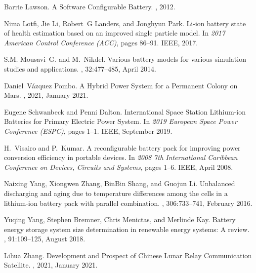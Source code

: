 \documentclass{article}
\begin{document}
\begin{thebibliography}{10}
Barrie Lawson.
\newblock A {{Software Configurable Battery}}.
, 2012.

Nima Lotfi, Jie Li, Robert~G Landers, and Jonghyun Park.
\newblock Li-ion battery state of health estimation based on an improved single
  particle model.
\newblock In {\em 2017 American Control Conference (ACC)}, pages 86--91. IEEE,
  2017.

S.M. Mousavi~G. and M.~Nikdel.
\newblock Various battery models for various simulation studies and
  applications.
, 32:477--485, April
  2014.

Daniel~V{\'a}zquez Pombo.
\newblock A {{Hybrid Power System}} for a {{Permanent Colony}} on {{Mars}}.
, 2021, January 2021.

Eugene Schwanbeck and Penni Dalton.
\newblock International {{Space Station Lithium-ion Batteries}} for {{Primary
  Electric Power System}}.
\newblock In {\em 2019 {{European Space Power Conference}} ({{ESPC}})}, pages
  1--1. {IEEE}, September 2019.

H.~Visairo and P.~Kumar.
\newblock A reconfigurable battery pack for improving power conversion
  efficiency in portable devices.
\newblock In {\em 2008 7th {{International Caribbean Conference}} on
  {{Devices}}, {{Circuits}} and {{Systems}}}, pages 1--6. {IEEE}, April 2008.

Naixing Yang, Xiongwen Zhang, BinBin Shang, and Guojun Li.
\newblock Unbalanced discharging and aging due to temperature differences among
  the cells in a lithium-ion battery pack with parallel combination.
, 306:733--741, February 2016.

Yuqing Yang, Stephen Bremner, Chris Menictas, and Merlinde Kay.
\newblock Battery energy storage system size determination in renewable energy
  systems: {{A}} review.
, 91:109--125, August
  2018.

Lihua Zhang.
\newblock Development and {{Prospect}} of {{Chinese Lunar Relay Communication
  Satellite}}.
, 2021, January 2021.

\end{thebibliography}

% 
% 
\end{document}
